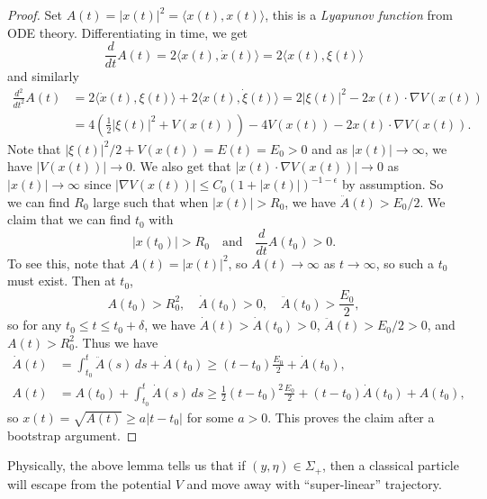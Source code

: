\begin{proof}
  Set $A(t) = |x(t)|^2 = \langle x(t), x(t) \rangle$, this is a
  \emph{Lyapunov function} from ODE theory.
  Differentiating in time, we get
  \[
    \frac{d}{dt} A(t)
    = 2 \langle x(t), \dot{x}(t) \rangle
    = 2 \langle x(t), \xi(t) \rangle
  \]
  and similarly
  \begin{align*}
    \frac{d^2}{dt^2} A(t)
    &= 2 \langle \dot{x}(t), \xi(t) \rangle
    + 2 \langle x(t), \dot{\xi}(t) \rangle
    = 2 |\xi(t)|^2 - 2 x(t) \cdot \nabla V(x(t)) \\
    &= 4 \left(\frac{1}{2} |\xi(t)|^2 + V(x(t))\right)
    - 4V(x(t)) - 2x(t) \cdot \nabla V(x(t)).
  \end{align*}
  Note that $|\xi(t)|^2 / 2 + V(x(t)) = E(t) = E_0 > 0$
  and as $|x(t)| \to \infty$, we have
  $|V(x(t))| \to 0$. We also get that
  $|x(t) \cdot \nabla V(x(t))| \to 0$
  as $|x(t)| \to \infty$
  since $|\nabla V(x(t))| \le C_0 (1 + |x(t)|)^{-1 - \epsilon}$
  by assumption. So we can find $R_0$
  large such that when $|x(t)| > R_0$,
  we have $\ddot{A}(t) > E_0 / 2$. We claim that we
  can find $t_0$ with
  \[
    |x(t_0)| > R_0 \quad \text{and} \quad
    \frac{d}{dt} A(t_0) > 0.
  \]
  To see this, note that $A(t) = |x(t)|^2$, so
  $A(t) \to \infty$ as $t \to \infty$, so
  such a $t_0$ must exist. Then at $t_0$,
  \[
    A(t_0) > R_0^2, \quad \dot{A}(t_0) > 0, \quad
    \ddot{A}(t_0) > \frac{E_0}{2},
  \]
  so for any $t_0 \le t \le t_0 + \delta$, we
  have
  $\dot{A}(t) > \dot{A}(t_0) > 0$,
  $\ddot{A}(t) > E_0 / 2 > 0$, and $A(t) > R_0^2$. Thus
  we have
  \begin{align*}
    \dot{A}(t)
    &= \int_{t_0}^t \ddot{A}(s)\, ds + \dot{A}(t_0)
    \ge (t - t_0) \frac{E_0}{2} + \dot{A}(t_0), \\
    A(t)
    & = A(t_0) + \int_{t_0}^t \dot{A}(s)\, ds
    \ge \frac{1}{2} (t - t_0)^2 \frac{E_0}{2}
    + (t - t_0) \dot{A}(t_0) + A(t_0),
  \end{align*}
  so $x(t) = \sqrt{A(t)} \ge a|t - t_0|$
  for some $a > 0$. This proves the
  claim after a bootstrap argument.
\end{proof}

\begin{remark}
  Physically, the above lemma tells us that
  if $(y, \eta) \in \Sigma_+$, then a classical
  particle will escape from the potential $V$
  and move away with ``super-linear''
  trajectory.
\end{remark}

